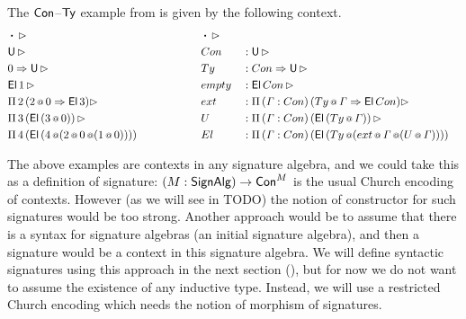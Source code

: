 \documentclass[a4paper,UKenglish,cleveref, autoref]{lipics-v2019}
\begin{document}
\begin{example}
  The $\mathsf{Con}$--$\mathsf{Ty}$ example from  is given by the
  following context.
  \begin{alignat*}{5}
    & \boldsymbol{\cdot} \,\rhd                                                 && \boldsymbol{\cdot} \,\rhd                                                                \\
    & \mathsf{U}\,\rhd                                                                  && Con && : \mathsf{U}\,\rhd                                                                        \\
    & 0\Rightarrow\mathsf{U}\,\rhd                                                              && Ty && : Con\Rightarrow\mathsf{U}\,\rhd                                                                   \\
    & \mathsf{El}\,1\,\rhd                                                              && empty && : \mathsf{El}\,Con\,\rhd                                                                \\
    & \Pi\,2\,(2\mathop{{\scriptstyle @}} 0 \Rightarrow \mathsf{El}\,3)\rhd                                       && ext && : \Pi\,(\mathit{\Gamma} : Con)\,(Ty\mathop{{\scriptstyle @}}\mathit{\Gamma} \Rightarrow \mathsf{El}\,Con)\rhd                         \\
    & \Pi\,3\,(\mathsf{El}\,(3\mathop{{\scriptstyle @}} 0))\,\rhd                                         && U && : \Pi\,(\mathit{\Gamma}:Con)\,(\mathsf{El}\,(Ty\mathop{{\scriptstyle @}}\mathit{\Gamma}))\,\rhd                                 \\
    & \Pi\,4\,(\mathsf{El}\,(4\mathop{{\scriptstyle @}}(2\mathop{{\scriptstyle @}} 0\mathop{{\scriptstyle @}} (1\mathop{{\scriptstyle @}} 0)))) \hspace{4.79em} && El && : \Pi\,(\mathit{\Gamma} : Con)\,(\mathsf{El}\,(Ty\mathop{{\scriptstyle @}}(ext\mathop{{\scriptstyle @}}\mathit{\Gamma}\mathop{{\scriptstyle @}} (U\mathop{{\scriptstyle @}}\mathit{\Gamma}))))
  \end{alignat*}
\end{example}

The above examples are contexts in any signature algebra, and we could
take this as a definition of signature: $(M:\mathsf{SignAlg})\rightarrow\mathsf{Con}^M$ is the
usual Church encoding of contexts. However (as we will see in TODO)
the notion of constructor for such signatures would be too
strong. Another approach would be to assume that there is a syntax for
signature algebras (an initial signature algebra), and then a
signature would be a context in this signature algebra. We will define
syntactic signatures using this approach in the next section
(), but for now we do not want to assume
the existence of any inductive type. Instead, we will use a restricted
Church encoding which needs the notion of morphism of signatures.
\end{document}
